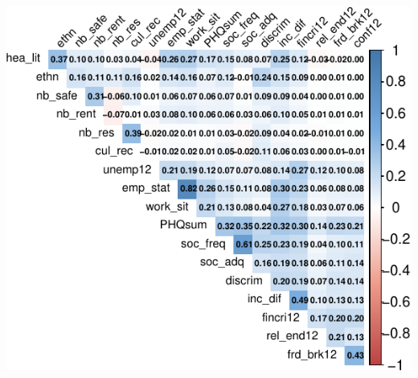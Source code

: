 \documentclass[
]{article}
\begin{document}
\begin{center}
\includegraphics{draft_v1_files/figure-pdf/unnamed-chunk-9-1.pdf}
\end{center}
\end{document}
